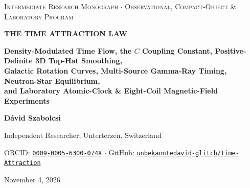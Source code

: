 \documentclass[10pt,a4paper]{article}
\begin{document}
\thispagestyle{titlefoot}
\vspace*{-8mm}
\noindent{\color{navy}\rule{\linewidth}{2pt}}\par\vspace{1.5mm}
\begin{center}
  {\footnotesize\scshape\color{slate}Intermediate Research Monograph $\cdot$ Observational, Compact-Object \& Laboratory Program}\par\vspace{1.5mm}
  {\LARGE\bfseries\color{navy}THE TIME ATTRACTION LAW}\par\vspace{2mm}
  {\large\bfseries\color{slate}Density-Modulated Time Flow, the $C$ Coupling Constant, Positive-Definite 3D Top-Hat Smoothing,}\\
  {\large\bfseries\color{slate}Galactic Rotation Curves, Multi-Source Gamma-Ray Timing, Neutron-Star Equilibrium,}\\
  {\large\bfseries\color{slate}and Laboratory Atomic-Clock \& Eight-Coil Magnetic-Field Experiments}\par\vspace{2mm}
  {\normalsize\bfseries D\'avid Szabolcsi}\par\vspace{1mm}
  {\small Independent Researcher, Unterterzen, Switzerland}\par
  {\small ORCID: \href{https://orcid.org/0009-0005-6300-074X}{\texttt{0009-0005-6300-074X}} $\cdot$ GitHub: \href{https://github.com/unbekanntedavid-glitch/Time-Attraction}{\texttt{unbekanntedavid-glitch/Time-Attraction}}}\par
  {\small November 4, 2026}
\end{center}
\vspace{1.5mm}
\noindent{\color{navy}\rule{\linewidth}{0.8pt}}\par\vspace{2mm}
\end{document}
